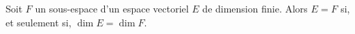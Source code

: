Soit $F$ un sous-espace d'un espace vectoriel $E$ de dimension finie. Alors $E=F$ si, et seulement si, $\dim E=\dim F$.

\begin{reponses}
\end{reponses}

